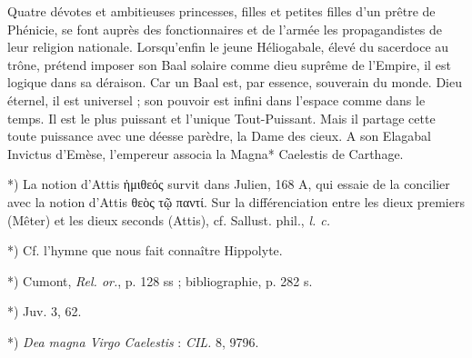 \documentclass[a4paper, 11pt, oneside, polutonikogreek, french]{article}
\begin{document}
Quatre dévotes et ambitieuses princesses, filles et petites filles d'un prêtre de Phénicie, se font auprès des fonctionnaires et de l'armée les propagandistes de leur religion nationale. Lorsqu'enfin le jeune Héliogabale, élevé du sacerdoce au trône, prétend imposer son Baal solaire comme dieu suprême de l'Empire, il est logique dans sa déraison. Car un Baal est, par essence, souverain du monde. Dieu éternel, il est universel ; son pouvoir est infini dans l'espace comme dans le temps. Il est le plus puissant et l'unique Tout-Puissant. Mais il partage cette toute puissance avec une déesse parèdre, la Dame des cieux. A son Elagabal Invictus d'Emèse, l'empereur associa la Magna* Caelestis de Carthage.

*) La notion d'Attis ἡμιθεός survit dans Julien, 168 A, qui essaie de la concilier avec la notion d'Attis θεὸς τῷ παντί. Sur la différenciation entre les dieux premiers (Mêter) et les dieux seconds (Attis), cf. Sallust. phil., \emph{l. c.}

*) Cf. l'hymne que nous fait connaître Hippolyte.

*) Cumont, \emph{Rel. or.}, p. 128 ss ; bibliographie, p. 282 s.

*) Juv. 3, 62.

*) \emph{Dea magna Virgo Caelestis} : \emph{CIL.} 8, 9796.
\end{document}
